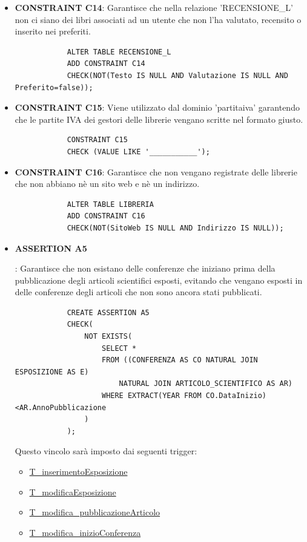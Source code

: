 \documentclass{article}
\begin{document}
\begin{itemize}
        \item \textbf{CONSTRAINT C14}: Garantisce che nella relazione 'RECENSIONE\_L' non ci siano dei libri associati ad un utente che non l'ha valutato, recensito o inserito nei preferiti.
        \begin{verbatim}
            ALTER TABLE RECENSIONE_L
            ADD CONSTRAINT C14
            CHECK(NOT(Testo IS NULL AND Valutazione IS NULL AND Preferito=false));
        \end{verbatim}

        \item \textbf{CONSTRAINT C15}: Viene utilizzato dal dominio 'partitaiva' garantendo che le partite IVA dei gestori delle librerie vengano scritte nel formato giusto.
        \begin{verbatim}
            CONSTRAINT C15
            CHECK (VALUE LIKE '___________');
        \end{verbatim}

        \item \textbf{CONSTRAINT C16}: Garantisce che non vengano registrate delle librerie che non abbiano nè un sito web e nè un indirizzo.
        \begin{verbatim}
            ALTER TABLE LIBRERIA
            ADD CONSTRAINT C16
            CHECK(NOT(SitoWeb IS NULL AND Indirizzo IS NULL));
        \end{verbatim}

        \item \hypertarget{assertion5}{\textbf{ASSERTION A5}}: Garantisce che non esistano delle conferenze che iniziano prima della pubblicazione degli articoli scientifici esposti, evitando che vengano esposti in delle conferenze degli articoli che non sono ancora stati pubblicati.
        \begin{verbatim}
            CREATE ASSERTION A5
            CHECK(
                NOT EXISTS(
                    SELECT *
                    FROM ((CONFERENZA AS CO NATURAL JOIN ESPOSIZIONE AS E) 
                        NATURAL JOIN ARTICOLO_SCIENTIFICO AS AR) 
                    WHERE EXTRACT(YEAR FROM CO.DataInizio)<AR.AnnoPubblicazione
                )
            );
        \end{verbatim}
    Questo vincolo sarà imposto dai seguenti trigger:
        \begin{itemize}
            \item \hyperlink{t11}{T\_inserimentoEsposizione}
            \item \hyperlink{t12}{T\_modificaEsposizione}
            \item \hyperlink{t13}{T\_modifica\_pubblicazioneArticolo}
            \item \hyperlink{t14}{T\_modifica\_inizioConferenza}
        \end{itemize}   


\end{itemize}
\end{document}
